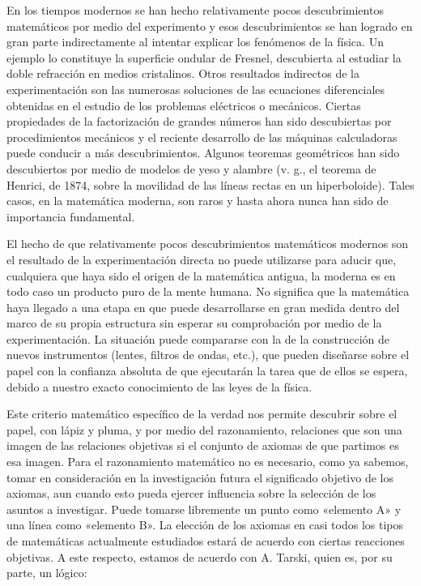 \documentclass[a4paper, 12pt]{article}
\begin{document}
{{En los tiempos modernos se han hecho relativamente pocos descubrimientos
matemáticos por medio del experimento y esos descubrimientos se han logrado en
gran parte indirectamente al intentar explicar los fenómenos de la física. Un
ejemplo lo constituye la superficie ondular de Fresnel, descubierta al estudiar
la doble refracción en medios cristalinos. Otros resultados indirectos de la
experimentación son las numerosas soluciones de las ecuaciones diferenciales
obtenidas en el estudio de los problemas eléctricos o mecánicos. Ciertas
propiedades de la factorización de grandes números han sido descubiertas por
procedimientos mecánicos y el reciente desarrollo de las máquinas calculadoras
puede conducir a más descubrimientos. Algunos teoremas geométricos han sido
descubiertos por medio de modelos de yeso y alambre (v. g., el teorema de
Henrici, de 1874, sobre la movilidad de las líneas rectas en un hiperboloide).
Tales casos, en la matemática moderna, son raros y hasta ahora nunca han sido de
importancia fundamental.

El hecho de que relativamente pocos descubrimientos matemáticos modernos son el
resultado de la experimentación directa no puede utilizarse para aducir que,
cualquiera que haya sido el origen de la matemática antigua, la moderna es en
todo caso un producto puro de la mente humana. No significa que la matemática
haya llegado a una etapa en que puede desarrollarse en gran medida dentro del
marco de su propia estructura sin esperar su comprobación por medio de la
experimentación. La situación puede compararse con la de la construcción de
nuevos instrumentos (lentes, filtros de ondas, etc.), que pueden diseñarse sobre
el papel con la confianza absoluta de que ejecutarán la tarea que de ellos se
espera, debido a nuestro exacto conocimiento de las leyes de la física.

Este criterio matemático específico de la verdad nos permite descubrir sobre el
papel, con lápiz y pluma, y por medio del razonamiento, relaciones que son una
imagen de las relaciones objetivas si el conjunto de axiomas de que partimos es
esa imagen. Para el razonamiento matemático no es necesario, como ya sabemos,
tomar en consideración en la investigación futura el significado objetivo de los
axiomas, aun cuando esto pueda ejercer influencia sobre la selección de los
asuntos a investigar. Puede tomarse libremente un punto como «elemento A» y una
línea como «elemento B». La elección de los axiomas en casi todos los tipos de
matemáticas actualmente estudiados estará de acuerdo con ciertas reacciones
objetivas. A este respecto, estamos de acuerdo con A. Tarski, quien es, por su
parte, un lógico:

}}
\end{document}
